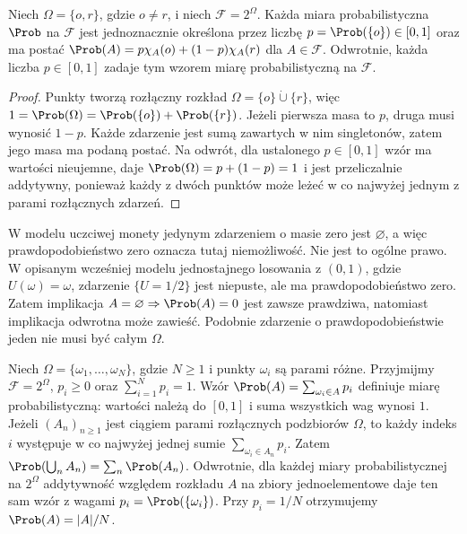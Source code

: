 \begin{stwierdzenie}
Niech $\Omega=\{o,r\}$, gdzie $o\ne r$, i niech
$\mathcal F=2^\Omega$. Każda miara probabilistyczna
$\Prob$ na $\mathcal F$ jest jednoznacznie określona przez
liczbę $p=\Prob(\{o\})\in[0,1]$ oraz ma postać
$\Prob(A)=p\chi_A(o)+(1-p)\chi_A(r)$
dla $A\in\mathcal F$. Odwrotnie, każda liczba $p\in[0,1]$
zadaje tym wzorem miarę probabilistyczną na $\mathcal F$.
\end{stwierdzenie}
\begin{proof}
Punkty tworzą rozłączny rozkład
$\Omega=\{o\}\mathbin{\dot\cup}\{r\}$, więc
$1=\Prob(\Omega)=\Prob(\{o\})+\Prob(\{r\})$.
Jeżeli pierwsza masa to $p$, druga musi wynosić $1-p$.
Każde zdarzenie jest sumą zawartych w nim singletonów, zatem
jego masa ma podaną postać. Na odwrót, dla ustalonego
$p\in[0,1]$ wzór ma wartości nieujemne, daje
$\Prob(\Omega)=p+(1-p)=1$ i jest przeliczalnie
addytywny, ponieważ każdy z dwóch punktów może leżeć
w co najwyżej jednym z parami rozłącznych zdarzeń.
\end{proof}

\begin{uwaga}
W modelu uczciwej monety jedynym zdarzeniem o masie zero jest
$\varnothing$, a więc prawdopodobieństwo zero oznacza tutaj
niemożliwość. Nie jest to ogólne prawo. W opisanym wcześniej modelu jednostajnego
losowania z $(0,1)$, gdzie $U(\omega)=\omega$, zdarzenie
$\{U=1/2\}$ jest niepuste,
ale ma prawdopodobieństwo zero. Zatem implikacja
$A=\varnothing\Rightarrow\Prob(A)=0$ jest zawsze prawdziwa,
natomiast implikacja odwrotna może zawieść. Podobnie zdarzenie
o prawdopodobieństwie jeden nie musi być całym $\Omega$.
\end{uwaga}

\begin{przyklad}
Niech $\Omega=\{\omega_1,\ldots,\omega_N\}$, gdzie $N\geq1$
i punkty $\omega_i$ są parami różne. Przyjmijmy
$\mathcal F=2^\Omega$, $p_i\geq0$ oraz $\sum_{i=1}^N p_i=1$.
Wzór $\Prob(A)=\sum_{\omega_i\in A}p_i$ definiuje miarę
probabilistyczną: wartości należą do $[0,1]$ i suma wszystkich
wag wynosi $1$. Jeżeli $(A_n)_{n\geq1}$ jest ciągiem parami
rozłącznych podzbiorów $\Omega$, to każdy indeks $i$ występuje
w co najwyżej jednej sumie $\sum_{\omega_i\in A_n}p_i$.
Zatem $\Prob(\bigcup_n A_n)=\sum_n\Prob(A_n)$.
Odwrotnie, dla każdej miary probabilistycznej na $2^\Omega$
addytywność względem rozkładu $A$ na zbiory jednoelementowe
daje ten sam wzór z wagami $p_i=\Prob(\{\omega_i\})$.
Przy $p_i=1/N$ otrzymujemy $\Prob(A)=|A|/N$.
\end{przyklad}


